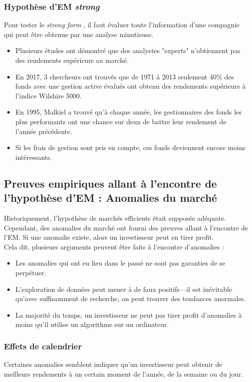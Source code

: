 \documentclass[10pt, french]{article}
\begin{document}
\begin{multicols*}{2}
\subsubsection{Hypothèse d'EM \og \textit{strong} \fg{}}
Pour tester le \og \textit{strong form} \fg{}, il faut évaluer toute l'information d'une compagnie qui peut être obtenue par une analyse minutieuse.
\begin{itemize}
	\item	Plusieurs études ont démontré que des analystes "experts" n'obtiennent pas des rendements supérieurs au marché.
	\item	En 2017, 3 chercheurs ont trouvés que de 1971 à 2013 seulement 40\% des fonds avec une gestion active évalués ont obtenu des rendements supérieurs à l'indice Wilshire 5000.
	\item	En 1995, Malkiel a trouvé qu'à chaque année, les gestionnaires des fonds les plus performants ont une chance sur deux de battre leur rendement de l'année précédente.
	\item	Si les frais de gestion sont pris en compte, ces fonds deviennent encore moins intéressants.
\end{itemize}


\columnbreak
\subsection{Preuves empiriques allant à l'encontre de l'hypothèse d'EM : Anomalies du marché}
Historiquement, l'hypothèse de marchés efficients était supposée adéquate. Cependant, des anomalies du marché ont fourni des preuves allant à l'encontre de l'EM. Si une anomalie existe, alors un investisseur peut en tirer profit.\\

Cela dit, plusieurs arguments peuvent être faits à l'encontre d'anomalies :
\begin{itemize}
	\item	Les anomalies qui ont eu lieu dans le passé ne sont pas garanties de se perpétuer.
	\item	L'exploration de données peut mener à de faux positifs---il est inévitable qu'avec suffisamment de recherche, on peut trouver des tendances anormales.
	\item	La majorité du temps, un investisseur ne peut pas tirer profit d'anomalies à moins qu'il utilise un algorithme sur un ordinateur.
\end{itemize}

\subsubsection{Effets de calendrier}
Certaines anomalies semblent indiquer qu'un investisseur peut obtenir de meilleurs rendements à un certain moment de l'année, de la semaine ou du jour.


\end{multicols*}
\end{document}
